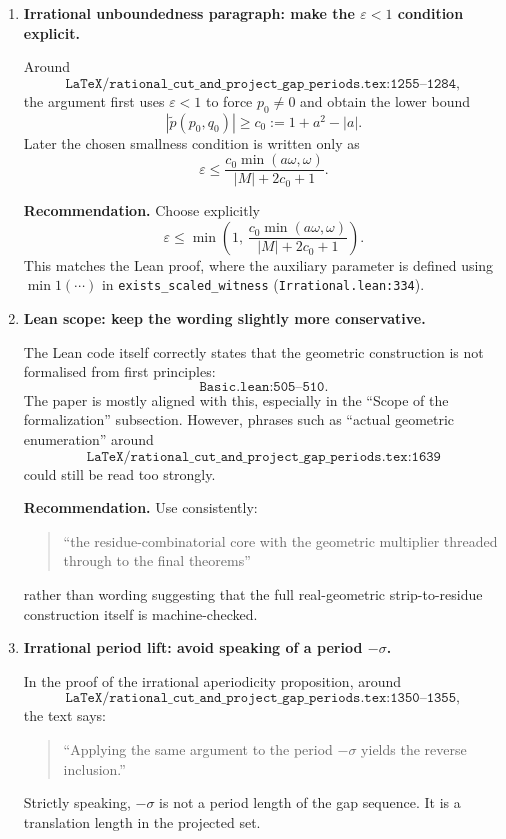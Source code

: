\documentclass[11pt]{article}
\begin{document}
\begin{enumerate}[label=\textbf{F\arabic*.},leftmargin=*]

\item \textbf{Irrational unboundedness paragraph: make the \(\varepsilon<1\)
condition explicit.}

Around
\[
\texttt{LaTeX/rational\_cut\_and\_project\_gap\_periods.tex:1255--1284},
\]
the argument first uses \(\varepsilon<1\) to force \(p_0\ne 0\) and obtain
the lower bound
\[
|\tilde p(p_0,q_0)| \ge c_0 := 1+a^2-|a|.
\]
Later the chosen smallness condition is written only as
\[
\varepsilon \le
 \frac{c_0\min(a\omega,\omega)}{|M|+2c_0+1}.
\]

\textbf{Recommendation.}  Choose explicitly
\[
\varepsilon \le
\min\!\left(1,\,
 \frac{c_0\min(a\omega,\omega)}{|M|+2c_0+1}\right).
\]
This matches the Lean proof, where the auxiliary parameter is defined using
\(\min 1(\cdots)\) in \texttt{exists\_scaled\_witness}
(\texttt{Irrational.lean:334}).

\item \textbf{Lean scope: keep the wording slightly more conservative.}

The Lean code itself correctly states that the geometric construction is not
formalised from first principles:
\[
\texttt{Basic.lean:505--510}.
\]
The paper is mostly aligned with this, especially in the ``Scope of the
formalization'' subsection.  However, phrases such as ``actual geometric
enumeration'' around
\[
\texttt{LaTeX/rational\_cut\_and\_project\_gap\_periods.tex:1639}
\]
could still be read too strongly.

\textbf{Recommendation.}  Use consistently:
\begin{quote}
``the residue-combinatorial core with the geometric multiplier threaded
through to the final theorems''
\end{quote}
rather than wording suggesting that the full real-geometric
strip-to-residue construction itself is machine-checked.

\item \textbf{Irrational period lift: avoid speaking of a period
\(-\sigma\).}

In the proof of the irrational aperiodicity proposition, around
\[
\texttt{LaTeX/rational\_cut\_and\_project\_gap\_periods.tex:1350--1355},
\]
the text says:
\begin{quote}
``Applying the same argument to the period \(-\sigma\) yields the reverse
inclusion.''
\end{quote}
Strictly speaking, \(-\sigma\) is not a period length of the gap sequence.
It is a translation length in the projected set.


\end{enumerate}
\end{document}
